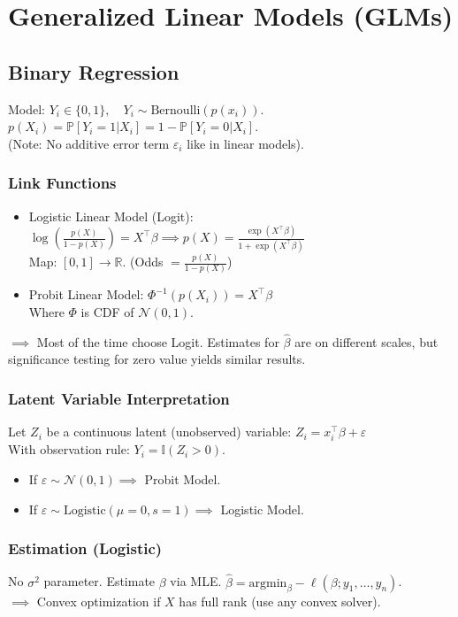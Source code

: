 \section{Generalized Linear Models (GLMs)}

\subsection{Binary Regression}
Model: $Y_i \in \{0,1\}, \quad Y_i \sim \text{Bernoulli}(p(x_i))$.
\\ $p(X_i) = \mathbb{P}[Y_i=1|X_i] = 1 - \mathbb{P}[Y_i=0|X_i]$.
\\ (Note: No additive error term $\varepsilon_i$ like in linear models).

\subsubsection*{Link Functions}
\begin{itemize}
    \item Logistic Linear Model (Logit):
    $\log\left(\frac{p(X)}{1-p(X)}\right) = X^\top \beta \implies p(X) = \frac{\exp(X^\top \beta)}{1 + \exp(X^\top \beta)}$
    \\ Map: $[0,1] \to \mathbb{R}$. 
    (Odds $=\frac{p(X)}{1-p(X)}$)
    \item Probit Linear Model:
    $\Phi^{-1}(p(X_i)) = X^\top \beta$
    \\ Where $\Phi$ is CDF of $\mathcal{N}(0,1)$.
\end{itemize}
$\implies$ Most of the time choose Logit. Estimates for $\hat{\beta}$ are on different scales, but significance testing for zero value yields similar results.

\subsubsection*{Latent Variable Interpretation}
Let $Z_i$ be a continuous latent (unobserved) variable:
$Z_i = x_i^\top \beta + \varepsilon$
\\ With observation rule: $Y_i = \mathbb{I}(Z_i > 0)$.
\begin{itemize}
    \item If $\varepsilon \sim \mathcal{N}(0,1) \implies$ Probit Model.
    \item If $\varepsilon \sim \text{Logistic}(\mu=0, s=1) \implies$ Logistic Model.
\end{itemize}

\subsubsection*{Estimation (Logistic)}
No $\sigma^2$ parameter. Estimate $\beta$ via MLE.
$\hat{\beta} = \text{argmin}_\beta -\ell(\beta; y_1, \dots, y_n)$.
\\ $\implies$ Convex optimization if $X$ has full rank (use any convex solver).

